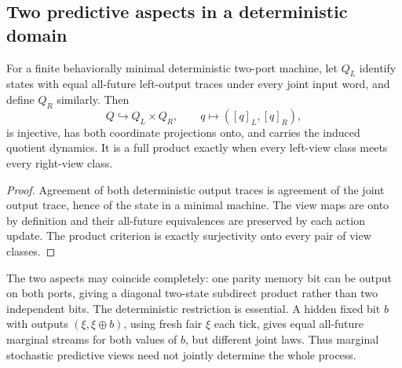 \subsection{Two predictive aspects in a deterministic domain}
\begin{proposition}\label{p2-33}
For a finite behaviorally minimal deterministic two-port machine, let \(Q_L\) identify states with equal all-future left-output traces under every joint input word, and define \(Q_R\) similarly. Then
\begin{equation}\label{eq:subdirect}
 Q\hookrightarrow Q_L\times Q_R,
 \qquad q\longmapsto([q]_L,[q]_R),
\end{equation}
is injective, has both coordinate projections onto, and carries the induced quotient dynamics. It is a full product exactly when every left-view class meets every right-view class.
\end{proposition}
\begin{proof}
Agreement of both deterministic output traces is agreement of the joint output trace, hence of the state in a minimal machine. The view maps are onto by definition and their all-future equivalences are preserved by each action update. The product criterion is exactly surjectivity onto every pair of view classes.
\end{proof}
The two aspects may coincide completely: one parity memory bit can be output on both ports, giving a diagonal two-state subdirect product rather than two independent bits. The deterministic restriction is essential. A hidden fixed bit \(b\) with outputs \((\xi,\xi\oplus b)\), using fresh fair \(\xi\) each tick, gives equal all-future marginal streams for both values of \(b\), but different joint laws. Thus marginal stochastic predictive views need not jointly determine the whole process.

